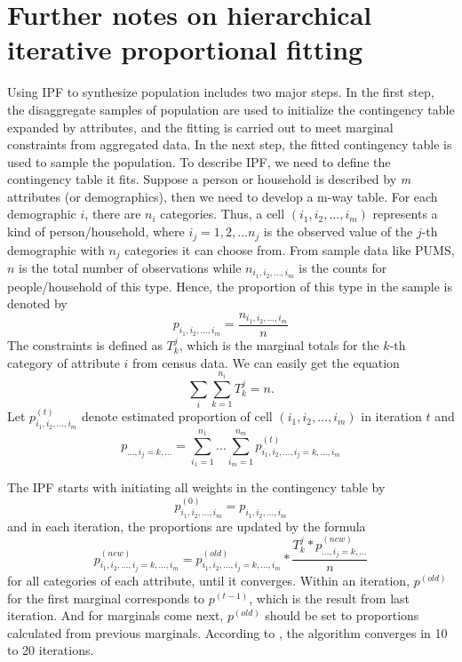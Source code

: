 \documentclass[11pt,twoside]{article}
\numberwithin{equation}{section}
\newcommand{\?}{\stackrel{?}{=}}
\begin{document}
\appendix
\section{Further notes on hierarchical iterative proportional fitting}
Using IPF to synthesize population includes two major steps.
In the first step, the disaggregate samples of population are used to initialize the contingency table expanded by attributes, and the fitting is carried out to meet marginal constraints from aggregated data.
In the next step, the fitted contingency table is used to sample the population.
To describe IPF, we need to define the contingency table it fits.
Suppose a person or household is described by \textit{m} attributes (or demographics), then we need to develop a m-way table.
For each demographic $i$, there are $n_i$ categories.
Thus, a cell $(i_1, i_2,..., i_m)$ represents a kind of person/household, where $i_j = 1,2,...n_j$ is the observed value of the $j$-th demographic with $n_j$ categories it can choose from.
From sample data like PUMS, $n$ is the total number of observations while $n_{i_1, i_2,...,i_m}$ is the counts for people/household of this type.
Hence, the proportion of this type in the sample is denoted by
\begin{equation}
  \label{eqn:prop}
   p_{i_1,i_2,...,i_m} = \frac{n_{i_1, i_2,...,i_m}}{n}
\end{equation}
The constraints is defined as $T_k^j$, which is the marginal totals for the $k$-th category of attribute $i$ from census data.
We can easily get the equation
\begin{equation}
  \label{eq:2}
\sum_i\sum_{k=1}^{n_i}T_k^j=n.  
\end{equation}
Let $p_{i_1,i_2,...,i_m}^{(t)}$ denote estimated proportion of cell $(i_1, i_2,..., i_m)$ in iteration $t$ and
\begin{equation}
  \label{eq:3}
  p_{...,i_j=k,...} = \sum_{i_1=1}^{n_1}...\sum_{i_m=1}^{n_m}p_{i_1,i_2,...,i_j=k,...,i_m}^{(t)}  
\end{equation}

The IPF starts with initiating all weights in the contingency table by  
\begin{equation}
	p_{i_1,i_2,...,i_m}^{(0)} = p_{i_1,i_2,...,i_m}
\end{equation}
and in each iteration, the proportions are updated by the formula
\begin{equation}
  p_{i_1,i_2,...,i_j=k,...,i_m}^{(new)} = p_{i_1,i_2,...,i_j=k,...,i_m}^{(old)} * \frac{T_k^j * p_{...,i_j=k,...}^{(new)}}{n} 
\end{equation} for all categories of each attribute, until it converges.
Within an iteration, $p^{(old)}$ for the first marginal corresponds to $p^{(t-1)}$, which is the result from last iteration.
And for marginals come next, $p^{(old)}$ should be set to proportions calculated from previous marginals.
According to \cite{beckman1996creating}, the algorithm converges in 10 to 20 iterations.
\end{document}
